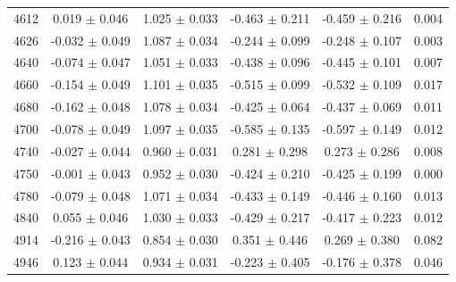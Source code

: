 \begin{table}[h]
{\begin{tabular}{cccccc}
        4612 & 0.019 $\pm$ 0.046 & 1.025 $\pm$ 0.033 & -0.463 $\pm$ 0.211 & -0.459 $\pm$ 0.216 & 0.004\\
        4626 & -0.032 $\pm$ 0.049 & 1.087 $\pm$ 0.034 & -0.244 $\pm$ 0.099 & -0.248 $\pm$ 0.107 & 0.003\\
        4640 & -0.074 $\pm$ 0.047 & 1.051 $\pm$ 0.033 & -0.438 $\pm$ 0.096 & -0.445 $\pm$ 0.101 & 0.007\\
        4660 & -0.154 $\pm$ 0.049 & 1.101 $\pm$ 0.035 & -0.515 $\pm$ 0.099 & -0.532 $\pm$ 0.109 & 0.017\\
        4680 & -0.162 $\pm$ 0.048 & 1.078 $\pm$ 0.034 & -0.425 $\pm$ 0.064 & -0.437 $\pm$ 0.069 & 0.011\\
        4700 & -0.078 $\pm$ 0.049 & 1.097 $\pm$ 0.035 & -0.585 $\pm$ 0.135 & -0.597 $\pm$ 0.149 & 0.012\\
        4740 & -0.027 $\pm$ 0.044 & 0.960 $\pm$ 0.031 & 0.281 $\pm$ 0.298 & 0.273 $\pm$ 0.286 & 0.008\\
        4750 & -0.001 $\pm$ 0.043 & 0.952 $\pm$ 0.030 & -0.424 $\pm$ 0.210 & -0.425 $\pm$ 0.199 & 0.000\\
        4780 & -0.079 $\pm$ 0.048 & 1.071 $\pm$ 0.034 & -0.433 $\pm$ 0.149 & -0.446 $\pm$ 0.160 & 0.013\\
        4840 & 0.055 $\pm$ 0.046 & 1.030 $\pm$ 0.033 & -0.429 $\pm$ 0.217 & -0.417 $\pm$ 0.223 & 0.012\\
        4914 & -0.216 $\pm$ 0.043 & 0.854 $\pm$ 0.030 & 0.351 $\pm$ 0.446 & 0.269 $\pm$ 0.380 & 0.082\\
        4946 & 0.123 $\pm$ 0.044 & 0.934 $\pm$ 0.031 & -0.223 $\pm$ 0.405 & -0.176 $\pm$ 0.378 & 0.046\\
        \hline\hline
        \end{tabular}
        }
\end{table}

